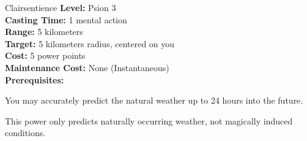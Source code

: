 {Clairsentience}
{
	\textbf{Level:}
	Psion 3\\
	\textbf{Casting Time:}
	1 mental action\\
	\textbf{Range:}
	5 kilometers\\
	\textbf{Target:}
	5 kilometers radius, centered on you\\
	\textbf{Cost:}
	5 power points\\
	\textbf{Maintenance Cost:}
	None (Instantaneous)\\
	\textbf{Prerequisites:}
	\\
}
{
	You may accurately predict the natural weather up to 24 hours into the future.

	This power only predicts naturally occurring weather, not magically induced conditions.
}